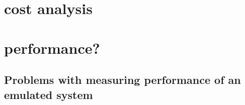 




\section{cost analysis}
\section{performance?}
\subsection{Problems with measuring performance of an emulated system}





